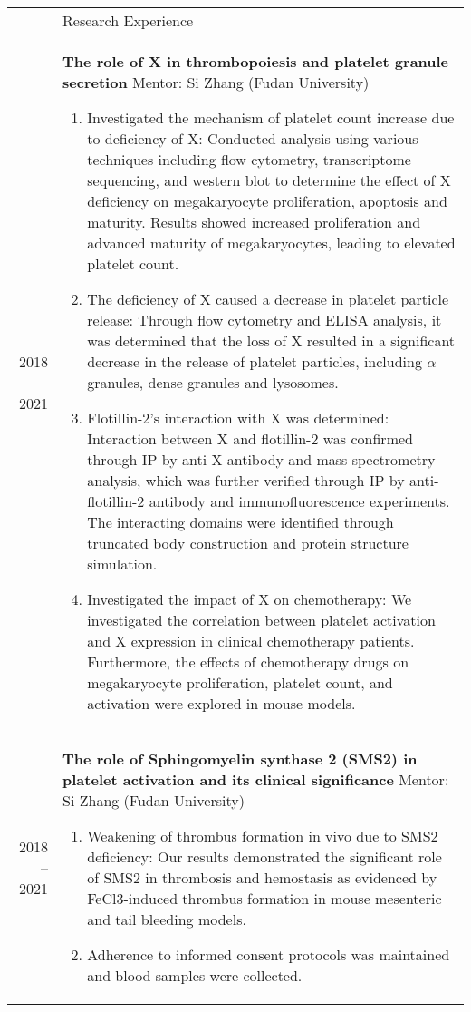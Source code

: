 \documentclass[letterpaper, 11pt]{article}
\newcommand{\headingfont}{\Large\color{LimeGreen}}
\newenvironment{SectionTable}[1]{
	\renewcommand*{\arraystretch}{1.7}
	\setlength{\tabcolsep}{10pt}
	\begin{longtable}{Rp{5.2in}} & #1 \\}
{\end{longtable}\vspace{-.3cm}}
\begin{document}
\begin{SectionTable}{\headingfont Research Experience}
2018 -- 2021 &
\textbf{The role of X in thrombopoiesis and platelet granule secretion} \newline
Mentor: Si Zhang (Fudan University)
\begin{enumerate}
	\item Investigated the mechanism of platelet count increase due to deficiency of X: Conducted analysis using various techniques including flow cytometry, transcriptome sequencing, and western blot to determine the effect of X deficiency on megakaryocyte proliferation, apoptosis and maturity. Results showed increased proliferation and advanced maturity of megakaryocytes, leading to elevated platelet count.
	\item The deficiency of X caused a decrease in platelet particle release: Through flow cytometry and ELISA analysis, it was determined that the loss of X resulted in a significant decrease in the release of platelet particles, including $\alpha$ granules, dense granules and lysosomes.
	\item Flotillin-2's interaction with X was determined: Interaction between X and flotillin-2 was confirmed through IP by anti-X antibody and mass spectrometry analysis, which was further verified through IP by anti-flotillin-2 antibody and immunofluorescence experiments. The interacting domains were identified through truncated body construction and protein structure simulation.
	\item Investigated the impact of X on chemotherapy: We investigated the correlation between platelet activation and X expression in clinical chemotherapy patients. Furthermore,  the effects of chemotherapy drugs on megakaryocyte proliferation, platelet count, and activation were explored in mouse models.
\end{enumerate} \\

2018 -- 2021 &
\textbf{The role of Sphingomyelin synthase 2 (SMS2) in platelet activation and its clinical significance} \newline
Mentor:  Si Zhang (Fudan University)
\begin{enumerate}
	\item Weakening of thrombus formation in vivo due to SMS2 deficiency: Our results demonstrated the significant role of SMS2 in thrombosis and hemostasis as evidenced by FeCl3-induced thrombus formation in mouse mesenteric and tail bleeding models.
	\item Adherence to informed consent protocols was maintained and blood samples were collected.
\end{enumerate} \\


\end{SectionTable}
\end{document}
